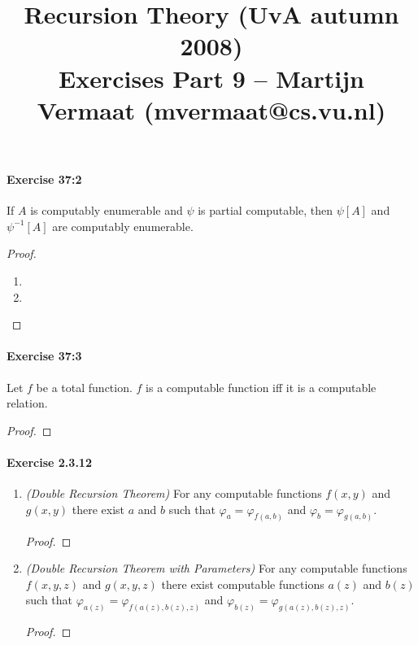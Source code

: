 \documentclass[a4paper,11pt]{article}
\title{Recursion Theory (UvA autumn 2008)\\
\normalsize{Exercises Part 9 -- Martijn Vermaat (mvermaat@cs.vu.nl)}}
\date{}
\begin{document}
\maketitle


\paragraph{Exercise 37:2}

If $A$ is computably enumerable and $\psi$ is partial computable, then $\psi[A]$ and $\psi^{-1}[A]$ are computably enumerable.

\begin{proof}
\begin{enumerate}[label=(\roman*)]
  \item
  \item \qedhere
\end{enumerate}
\end{proof}


\paragraph{Exercise 37:3}

Let $f$ be a total function. $f$ is a computable function iff it is a computable relation.

\begin{proof}
\end{proof}


\paragraph{Exercise 2.3.12}

\begin{enumerate}[label=(\alph*)]

\item
\emph{(Double Recursion Theorem)} For any computable functions $f(x, y)$ and $g(x, y)$ there exist $a$ and $b$ such that $\varphi_a = \varphi_{f(a, b)}$ and $\varphi_b = \varphi_{g(a, b)}$.

\begin{proof}
\end{proof}

\item
\emph{(Double Recursion Theorem with Parameters)} For any computable functions $f(x, y, z)$ and $g(x, y, z)$ there exist computable functions $a(z)$ and $b(z)$ such that $\varphi_{a(z)} = \varphi_{f(a(z), b(z), z)}$ and $\varphi_{b(z)} = \varphi_{g(a(z), b(z), z)}$.

\begin{proof}
\end{proof}

\end{enumerate}
\end{document}

